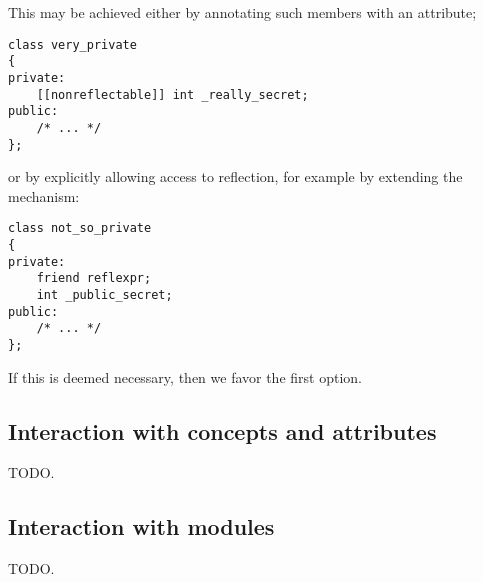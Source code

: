 This may be achieved either by annotating such members with an attribute;

\begin{verbatim}
class very_private
{
private:
	[[nonreflectable]] int _really_secret;
public:
	/* ... */
};
\end{verbatim}

or by explicitly allowing access to reflection, for example by extending
the \verb@friend@ mechanism:

\begin{verbatim}
class not_so_private
{
private:
	friend reflexpr;
	int _public_secret;
public:
	/* ... */
};
\end{verbatim}

If this is deemed necessary, then we favor the first option.

\subsection{Interaction with concepts and attributes}

TODO.

\subsection{Interaction with modules}

TODO.

